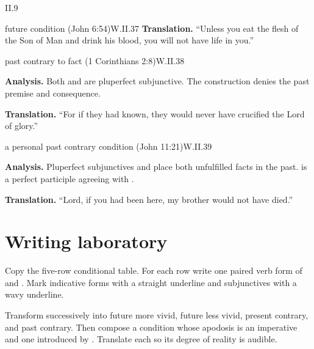 \begin{courseunit}{II.9}
\begin{workedexample}{future condition (John 6:54)}{W.II.37}
\textbf{Translation.}  ``Unless you eat the flesh of the Son of Man and drink his blood, you
will not have life in you.''
\end{workedexample}

\begin{workedexample}{past contrary to fact (1 Corinthians 2:8)}{W.II.38}

\textbf{Analysis.}  Both  and  are pluperfect
subjunctive.  The construction denies the past premise and consequence.

\textbf{Translation.}  ``For if they had known, they would never have crucified the Lord of
glory.''
\end{workedexample}

\begin{workedexample}{a personal past contrary condition (John 11:21)}{W.II.39}

\textbf{Analysis.}  Pluperfect subjunctives  and  place both
unfulfilled facts in the past.   is a perfect participle agreeing with
.

\textbf{Translation.}  ``Lord, if you had been here, my brother would not have died.''
\end{workedexample}

\section{Writing laboratory}

Copy the five-row conditional table.  For each row write one paired verb form of 
and .  Mark indicative forms with a straight underline and subjunctives with a
wavy underline.

Transform  successively into future more vivid, future less vivid,
present contrary, and past contrary.  Then compose a condition whose apodosis is an imperative
and one introduced by .  Translate each so its degree of reality is audible.



\end{courseunit}

